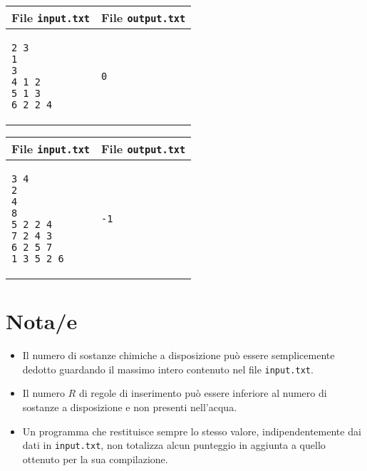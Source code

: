 \documentclass[a4paper,11pt]{article}
\begin{document}
    \noindent
    \begin{tabular}{p{11cm}|p{5cm}}
    \toprule
    \textbf{File \texttt{input.txt}}
    & \textbf{File \texttt{output.txt}}
    \\
    \midrule
    \scriptsize
    \begin{verbatim}
2 3
1
3
4 1 2
5 1 3
6 2 2 4
\end{verbatim}
    &
    \scriptsize
    \begin{verbatim}
0
\end{verbatim}
    \\
    \bottomrule
    \end{tabular}
  
    \noindent
    \begin{tabular}{p{11cm}|p{5cm}}
    \toprule
    \textbf{File \texttt{input.txt}}
    & \textbf{File \texttt{output.txt}}
    \\
    \midrule
    \scriptsize
    \begin{verbatim}
3 4
2
4
8
5 2 2 4
7 2 4 3
6 2 5 7
1 3 5 2 6
\end{verbatim}
    &
    \scriptsize
    \begin{verbatim}
-1
\end{verbatim}
    \\
    \bottomrule
    \end{tabular}
  
\section*{Nota/e}
\begin{itemize}
  
    \item Il numero di sostanze chimiche a disposizione può essere
  semplicemente dedotto guardando il massimo intero contenuto nel
  file \texttt{input.txt}.
    \item Il numero $R$ di regole di inserimento può essere
  inferiore al numero di sostanze a disposizione e non presenti nell'acqua.
    \item Un programma che restituisce sempre lo stesso valore,
indipendentemente dai dati in \texttt{input.txt}, non totalizza
alcun punteggio in aggiunta a quello ottenuto per la sua
compilazione.
\end{itemize}
\end{document}
